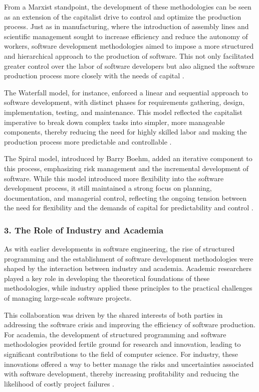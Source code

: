 \begin{refsection}
\begin{multicols}{2}
{From a Marxist standpoint, the development of these methodologies can be seen as an extension of the capitalist drive to control and optimize the production process. Just as in manufacturing, where the introduction of assembly lines and scientific management sought to increase efficiency and reduce the autonomy of workers, software development methodologies aimed to impose a more structured and hierarchical approach to the production of software. This not only facilitated greater control over the labor of software developers but also aligned the software production process more closely with the needs of capital \cite{braverman1974labor}.

The Waterfall model, for instance, enforced a linear and sequential approach to software development, with distinct phases for requirements gathering, design, implementation, testing, and maintenance. This model reflected the capitalist imperative to break down complex tasks into simpler, more manageable components, thereby reducing the need for highly skilled labor and making the production process more predictable and controllable \cite{royce1970waterfall}.

The Spiral model, introduced by Barry Boehm, added an iterative component to this process, emphasizing risk management and the incremental development of software. While this model introduced more flexibility into the software development process, it still maintained a strong focus on planning, documentation, and managerial control, reflecting the ongoing tension between the need for flexibility and the demands of capital for predictability and control \cite{boehm1988spiral}.

\subsubsection*{3. The Role of Industry and Academia}

As with earlier developments in software engineering, the rise of structured programming and the establishment of software development methodologies were shaped by the interaction between industry and academia. Academic researchers played a key role in developing the theoretical foundations of these methodologies, while industry applied these principles to the practical challenges of managing large-scale software projects.

This collaboration was driven by the shared interests of both parties in addressing the software crisis and improving the efficiency of software production. For academia, the development of structured programming and software methodologies provided fertile ground for research and innovation, leading to significant contributions to the field of computer science. For industry, these innovations offered a way to better manage the risks and uncertainties associated with software development, thereby increasing profitability and reducing the likelihood of costly project failures \cite{fuchs2014digital}.

}
\end{multicols}
\end{refsection}

